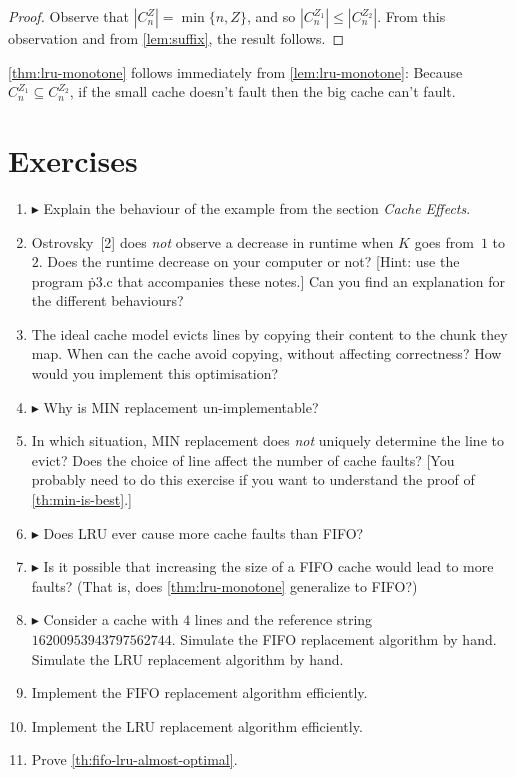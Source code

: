 \begin{proof}
Observe that $|C^Z_n|=\min\{n, Z\}$, and so $|C^{Z_1}_n|\le|C^{Z_2}_n|$.
From this observation and from \autoref{lem:suffix},
  the result follows.
\end{proof}

\autoref{thm:lru-monotone} follows immediately from \autoref{lem:lru-monotone}:
Because $C^{Z_1}_n \subseteq C^{Z_2}_n$,
  if the small cache doesn't fault then the big cache can't fault.

\section*{Exercises}

\begin{enumerate}
\item
  $\blacktriangleright$
  Explain the behaviour of the example from the section \emph{Cache Effects}.
\item
  Ostrovsky~[2] does \emph{not} observe a decrease in runtime
    when $K$ goes from~$1$ to~$2$.
  Does the runtime decrease on your computer or not?
  [Hint: use the program \.{p3.c} that accompanies these notes.]
  Can you find an explanation for the different behaviours?
\item
  The ideal cache model evicts lines by copying their content to the chunk they map.
  When can the cache avoid copying, without affecting correctness?
  How would you implement this optimisation?
\item
  $\blacktriangleright$
  Why is MIN replacement un-implementable?
\item
  In which situation,
  MIN replacement does \emph{not} uniquely determine the line to evict?
  Does the choice of line affect the number of cache faults?
  [You probably need to do this exercise if you want to understand
    the proof of \autoref{th:min-is-best}.]
\item
  $\blacktriangleright$
  Does LRU ever cause more cache faults than FIFO?
\item
  $\blacktriangleright$
  Is it possible that increasing the size of a FIFO cache would lead to more faults?
  (That is, does \autoref{thm:lru-monotone} generalize to FIFO?)
\item
  $\blacktriangleright$
  Consider a cache with $4$ lines and the reference string $16200953943797562744$.
  Simulate the FIFO replacement algorithm by hand.
  Simulate the LRU replacement algorithm by hand.
\item
  Implement the FIFO replacement algorithm efficiently.
\item
  Implement the LRU replacement algorithm efficiently.
\item
  Prove \autoref{th:fifo-lru-almost-optimal}.
\end{enumerate}

